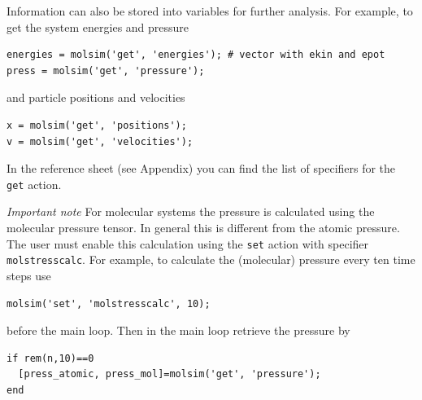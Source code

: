 \documentclass[11pt]{article}
\begin{document}
Information can also be stored into variables for further analysis. For example,
to get the system energies and pressure
\begin{verbatim}
energies = molsim('get', 'energies'); # vector with ekin and epot
press = molsim('get', 'pressure');
\end{verbatim}
and particle positions and velocities
\begin{verbatim}
x = molsim('get', 'positions');
v = molsim('get', 'velocities');
\end{verbatim}
In the reference sheet (see Appendix) you can find the list of specifiers for the \verb!get! action.


\textit{Important note} For molecular systems the pressure is
calculated using the molecular pressure tensor. In general this is different
from the atomic pressure. The user must enable this calculation using the
\verb!set! action with specifier \verb!molstresscalc!. For example, to
calculate the (molecular) pressure every ten time steps use
\begin{verbatim}
molsim('set', 'molstresscalc', 10);
\end{verbatim}
before the main loop. Then in the main loop retrieve the pressure by
\begin{verbatim}
if rem(n,10)==0
  [press_atomic, press_mol]=molsim('get', 'pressure');
end
\end{verbatim}
\end{document}
